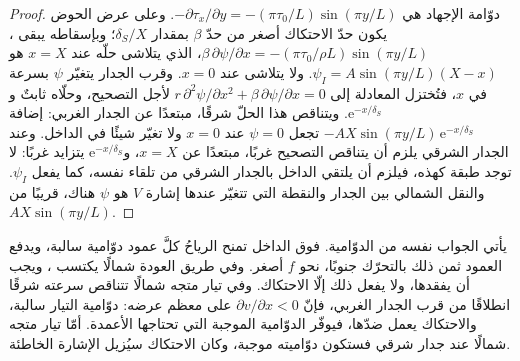 \begin{proof}
دوّامة الإجهاد هي $-\partial\tau_x/\partial y = -(\pi\tau_0/L)\sin(\pi
y/L)$. وعلى عرض الحوض يكون حدّ الاحتكاك أصغر من حدّ
$\beta$ بمقدار $\delta_S/X$؛ وبإسقاطه يبقى ،
$\beta\,\partial\psi/\partial x = -(\pi\tau_0/\rho L)\sin(\pi y/L)$، الذي يتلاشى حلّه عند
$x = X$ هو $\psi_I = A\sin(\pi y/L)(X - x)$. ولا يتلاشى
عند $x = 0$. وقرب الجدار يتغيّر $\psi$ بسرعة في $x$، فتُختزل
المعادلة إلى $r\,\partial^2\psi/\partial x^2 + \beta\,\partial\psi/
\partial x = 0$ لأجل التصحيح، وحلّاه ثابتٌ
و$\mathrm e^{-x/\delta_S}$. ويتناقص هذا الحلّ شرقًا، مبتعدًا عن الجدار الغربي:
إضافة $-AX\sin(\pi y/L)\,\mathrm e^{-x/\delta_S}$ تجعل $\psi = 0$
عند $x = 0$ ولا تغيّر شيئًا في الداخل. وعند الجدار الشرقي يلزم أن يتناقص
التصحيح غربًا، مبتعدًا عن $x = X$،
و$\mathrm e^{-x/\delta_S}$ يتزايد غربًا: لا توجد طبقة كهذه، فيلزم أن
يلتقي الداخل بالجدار الشرقي من تلقاء نفسه، كما يفعل $\psi_I$.
والنقل الشمالي بين الجدار والنقطة التي تتغيّر عندها إشارة $V$
هو $\psi$ هناك، قريبًا من $AX\sin(\pi y/L)$.
\end{proof}

يأتي الجواب نفسه من الدوّامية. فوق الداخل تمنح الرياحُ كلَّ عمود
دوّامية سالبة، ويدفع العمود ثمن ذلك بالتحرّك جنوبًا،
نحو $f$ أصغر. وفي طريق العودة شمالًا يكتسب ،
ويجب أن يفقدها، ولا يفعل ذلك إلّا الاحتكاك. وفي تيار متجه شمالًا تتناقص سرعته شرقًا
انطلاقًا من قرب الجدار الغربي، فإنّ $\partial
v/\partial x < 0$ على معظم عرضه: دوّامية التيار سالبة، والاحتكاك يعمل ضدّها،
فيوفّر الدوّامية الموجبة التي تحتاجها الأعمدة. أمّا تيار متجه شمالًا
عند جدار شرقي فستكون دوّاميته موجبة، وكان
الاحتكاك سيُزيل الإشارة الخاطئة.

